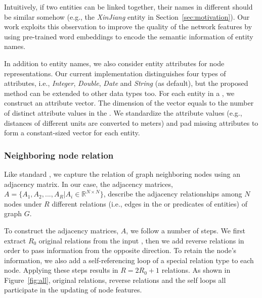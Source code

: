 	
	\label{wordvector}
	Intuitively, if two entities can be linked together, their names in different \KGs should be similar somehow (e.g., the \emph{XinJiang} entity in Section~\ref{sec:motivation}).
	Our work exploits this observation to improve the quality of the network features by using pre-trained word embeddings to encode the semantic information of entity names.

	
    In addition to entity names, we also consider entity attributes for node representations.
	Our current implementation distinguishes four types of attributes, i.e., \emph{Integer}, \emph{Double}, \emph{Date} and \emph{String} (as default), but the proposed method can be extended to other data types too.
%	
	For each entity in a \KG, we construct an attribute vector. The dimension of the vector equals to the number of distinct attribute values in the \KG.
	We standardize the attribute values (e.g., distances of different units are converted to meters) and pad missing attributes to form a constant-sized
	vector for each entity.

 \subsubsection{Neighboring node relation}
 Like standard \RGCNs, we capture the relation of graph neighboring nodes using an adjacency matrix.
 In our case, the adjacency matrices, $A=\{A_1,A_2,...,A_R |A_i \in \mathbb{R}^{N
 \times N} \}$, describe the adjacency relationships among $N$ nodes under $R$ different relations (i.e., edges in the \KG or predicates of entities) of graph $G$.

 To construct the adjacency matrices, $A$, we follow a number of steps. We first extract $R_0$ original
 relations from the input \KGs, then we add reverse relations in order to pass information from the opposite direction. To retain the node's
 information, we also add a self-referencing loop of a special relation type to each node. Applying these steps results in $R=2R_0+1$ relations. As shown in Figure~\ref{fig:all}, original relations, reverse relations and the self loops all participate in the updating of node features.

